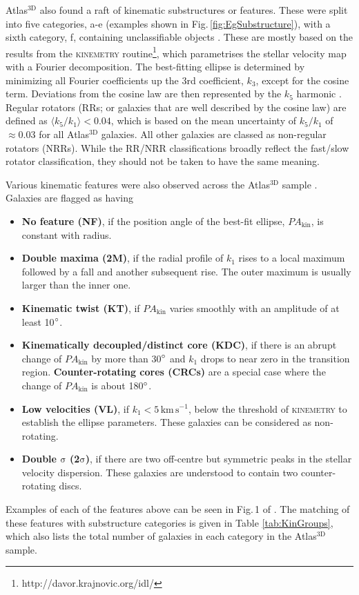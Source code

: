 	Atlas$^\text{3D}$ also found a raft of kinematic substructures or features. These were split into five categories, a-e (examples shown in Fig.\,\ref{fig:EgSubstructure}), with a sixth category, f, containing unclassifiable objects \citep{Krajnovic2011}. These are mostly based on the results from the \textsc{kinemetry} routine\footnote{http://davor.krajnovic.org/idl/}\citep{Krajnovic2006}, which parametrises the stellar velocity map with a Fourier decomposition. The best-fitting ellipse is determined by minimizing all Fourier coefficients up the 3rd coefficient, $k_3$, except for the cosine term. Deviations from the cosine law are then represented by the $k_5$ harmonic \citep{Krajnovic2006}. Regular rotators (RRs; or galaxies that are well described by the cosine law) are defined as $\langle k_5/k_1 \rangle < 0.04$, which is based on the mean uncertainty of $k_5/k_1$ of $\approx 0.03$ for all Atlas$^\text{3D}$ galaxies. All other galaxies are classed as non-regular rotators (NRRs). While the RR/NRR classifications broadly reflect the fast/slow rotator classification, they should not be taken to have the same meaning. 

	Various kinematic features were also observed across the Atlas$^\text{3D}$ sample \citep{Krajnovic2011}. Galaxies are flagged as having
	\begin{itemize}
		\item \textbf{No feature (NF)}, if the position angle of the best-fit ellipse, $PA_\mathrm{kin}$, is constant with radius.
		\item \textbf{Double maxima (2M)}, if the radial profile of $k_1$ rises to a local maximum followed by a fall and another subsequent rise. The outer maximum is usually larger than the inner one. 
		\item \textbf{Kinematic twist (KT)}, if $PA_\mathrm{kin}$ varies smoothly with an amplitude of at least 10$\degree$. 
		\item \textbf{Kinematically decoupled/distinct core (KDC)}, if there is an abrupt change of $PA_\mathrm{kin}$ by more than 30$\degree$ and $k_1$ drops to near zero in the transition region. \textbf{Counter-rotating cores (CRCs)} are a special case where the change of $PA_\mathrm{kin}$ is about 180$\degree$.
		\item \textbf{Low velocities (VL)}, if $k_1 < 5 \, \mathrm{km \, s^{-1}}$, below the threshold of \textsc{kinemetry} to establish the ellipse parameters. These galaxies can be considered as non-rotating.
		\item \textbf{Double $\mathrm{\sigma}$ (2$\mathrm{\sigma}$)}, if there are two off-centre but symmetric peaks in the stellar velocity dispersion. These galaxies are understood to contain two counter-rotating discs. 
	\end{itemize}
	Examples of each of the features above can be seen in Fig.\,1 of \citet{Krajnovic2011}. The matching of these features with substructure categories is given in Table \ref{tab:KinGroups}, which also lists the total number of galaxies in each category in the Atlas$^\text{3D}$ sample. 

